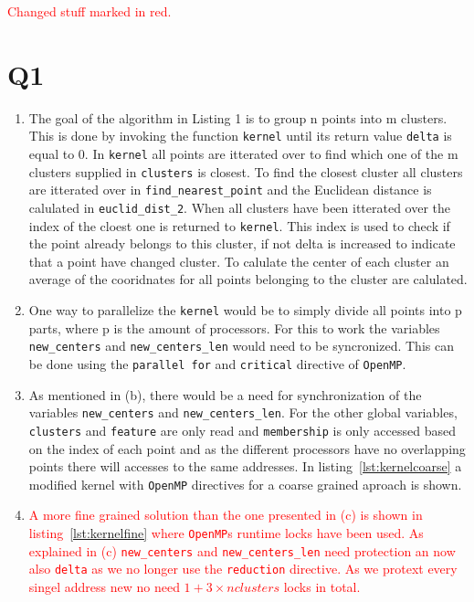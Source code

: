 \documentclass[a4paper]{article}
\begin{document}
\textcolor{red}{\huge Changed stuff marked in red.}
\section*{Q1}
\begin{enumerate}
\item %
The goal of the algorithm in Listing 1 is to group n points into m clusters. This is done by invoking the function \texttt{kernel} until its return value \texttt{delta} is equal to 0. In \texttt{kernel} all points are itterated over to find which one of the m clusters supplied in \texttt{clusters} is closest. To find the closest cluster all clusters are itterated over in \texttt{find\_nearest\_point} and the Euclidean distance is calulated in \texttt{euclid\_dist\_2}. When all clusters have been itterated over the index of the cloest one is returned to \texttt{kernel}. This index is used to check if the point already belongs to this cluster, if not delta is increased to indicate that a point have changed cluster. To calulate the center of each cluster an average of the cooridnates for all points belonging to the cluster are calulated. 

\item %
\label{itm:b}
One way to parallelize the \texttt{kernel} would be to simply divide all points into p parts, where p is the amount of processors. For this to work the variables \texttt{new\_centers} and \texttt{new\_centers\_len} would need to be syncronized. This can be done using the \texttt{parallel for} and \texttt{critical} directive of \texttt{OpenMP}. 

\item %
\label{itm:c}
As mentioned in (b), there would be a need for synchronization of the variables \texttt{new\_centers} and \texttt{new\_centers\_len}. For the other global variables, \texttt{clusters} and \texttt{feature} are only read and \texttt{membership} is only accessed based on the index of each point and as the different processors have no overlapping points there will accesses to the same addresses. In listing~\ref{lst:kernelcoarse} a modified kernel with \texttt{OpenMP} directives for a coarse grained aproach is shown.

\item %
\textcolor{red}{
A more fine grained solution than the one presented in (c) is shown in listing~\ref{lst:kernelfine} where \texttt{OpenMP}s runtime locks have been used. As explained in (c) \texttt{new\_centers} and \texttt{new\_centers\_len} need protection an now also \texttt{delta} as we no longer use the \texttt{reduction} directive. As we protext every singel address new no need $ 1 + 3 \times nclusters$ locks in total.
}


\end{enumerate}
\lstset{language=C,frame=single}

\textcolor{red}{

}
\end{document}
